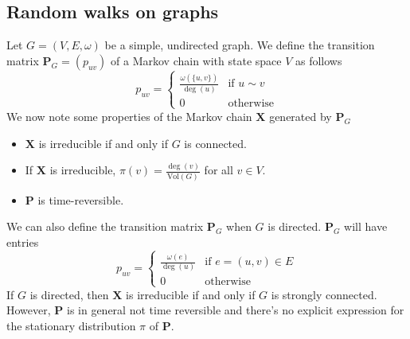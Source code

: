 \subsection{Random walks on graphs}
\label{sec:random-walks-graphs}
Let $G = (V,E,\omega)$ be a simple, undirected graph. We define the transition
matrix $\mathbf{P}_G = (p_{uv})$ of a Markov chain with state space $V$ as follows
\begin{equation}
  \label{eq:20}
  p_{uv} = \begin{cases}
    \tfrac{\omega(\{u,v\})}{\deg(u)} & \text{if $u \sim v$} \\
    0 & \text{otherwise}
  \end{cases}
\end{equation}
We now note some properties of the Markov chain $\mathbf{X}$ generated
by $\mathbf{P}_G$
\begin{itemize}
\item $\mathbf{X}$ is irreducible if and only if $G$ is connected.
\item If $\mathbf{X}$ is irreducible, $\pi(v) =
  \tfrac{\deg(v)}{\mathrm{Vol}(G)}$ for all $v \in V$.
\item $\mathbf{P}$ is time-reversible.
\end{itemize}
We can also define the transition matrix $\mathbf{P}_G$ when $G$ is
directed. $\mathbf{P}_G$ will have entries
\begin{equation}
  \label{eq:18}
  p_{uv} = \begin{cases}
    \tfrac{\omega(e)}{\deg(u)} & \text{if $e = (u,v) \in E$} \\
    0 & \text{otherwise}
  \end{cases}
\end{equation}
If $G$ is directed, then $\mathbf{X}$ is irreducible if and only if
$G$ is strongly connected. However, $\mathbf{P}$ is in general not
time reversible and there's no explicit expression for the
stationary distribution $\pi$ of $\mathbf{P}$.

